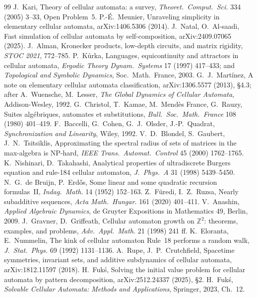 \documentclass[11pt]{article}
\theoremstyle{definition}
\theoremstyle{remark}
\newcommand{\Z}{\mathbb{Z}}
\begin{document}
\begin{thebibliography}{99}
 J.~Kari, Theory of cellular automata: a survey, \emph{Theoret.\ Comput.\ Sci.} 334 (2005) 3--33, Open Problem~5.
 P.-\'E.~Meunier, Unraveling simplicity in elementary cellular automata, arXiv:1406.5306 (2014).
 J.~Natal, O.~Al-saadi, Fast simulation of cellular automata by self-composition, arXiv:2409.07065 (2025).
 J.~Alman, Kronecker products, low-depth circuits, and matrix rigidity, \emph{STOC 2021}, 772--785.
 P.~K\r{u}rka, Languages, equicontinuity and attractors in cellular automata, \emph{Ergodic Theory Dynam.\ Systems} 17 (1997) 417--433; and \emph{Topological and Symbolic Dynamics}, Soc.\ Math.\ France, 2003.
 G.~J.~Mart\'inez, A note on elementary cellular automata classification, arXiv:1306.5577 (2013), \S4.3; after A.~Wuensche, M.~Lesser, \emph{The Global Dynamics of Cellular Automata}, Addison-Wesley, 1992.
 G.~Christol, T.~Kamae, M.~Mend\`es France, G.~Rauzy, Suites alg\'ebriques, automates et substitutions, \emph{Bull.\ Soc.\ Math.\ France} 108 (1980) 401--419.
 F.~Baccelli, G.~Cohen, G.~J.~Olsder, J.-P.~Quadrat, \emph{Synchronization and Linearity}, Wiley, 1992.
 V.~D.~Blondel, S.~Gaubert, J.~N.~Tsitsiklis, Approximating the spectral radius of sets of matrices in the max-algebra is NP-hard, \emph{IEEE Trans.\ Automat.\ Control} 45 (2000) 1762--1765.
 K.~Nishinari, D.~Takahashi, Analytical properties of ultradiscrete Burgers equation and rule-184 cellular automaton, \emph{J.~Phys.~A} 31 (1998) 5439--5450.
 N.~G.~de Bruijn, P.~Erd\H{o}s, Some linear and some quadratic recursion formulas~II, \emph{Indag.\ Math.} 14 (1952) 152--163.
 Z.~F\"uredi, I.~Z.~Ruzsa, Nearly subadditive sequences, \emph{Acta Math.\ Hungar.} 161 (2020) 401--411.
 V.~Anashin, \emph{Applied Algebraic Dynamics}, de Gruyter Expositions in Mathematics 49, Berlin, 2009.
 J.~Gravner, D.~Griffeath, Cellular automaton growth on $\Z^2$: theorems, examples, and problems, \emph{Adv.\ Appl.\ Math.} 21 (1998) 241 ff.
 K.~Eloranta, E.~Nummelin, The kink of cellular automaton Rule~18 performs a random walk, \emph{J.~Stat.\ Phys.} 69 (1992) 1131--1136.
 A.~Rupe, J.~P.~Crutchfield, Spacetime symmetries, invariant sets, and additive subdynamics of cellular automata, arXiv:1812.11597 (2018).
 H.~Fuk\'s, Solving the initial value problem for cellular automata by pattern decomposition, arXiv:2512.24337 (2025), \S2.
 H.~Fuk\'s, \emph{Solvable Cellular Automata: Methods and Applications}, Springer, 2023, Ch.~12.

\end{thebibliography}
\end{document}

